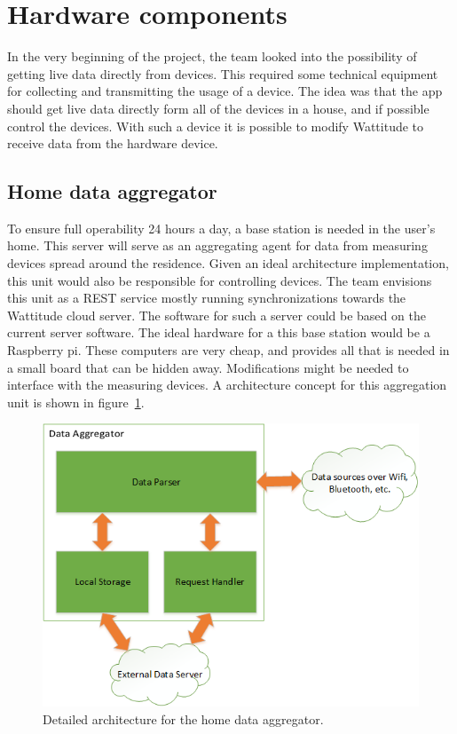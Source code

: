\section{Hardware components}
In the very beginning of the project, the team looked into the possibility of getting live data directly from devices. This required some technical equipment for collecting and transmitting the usage of a device. The idea was that the app should get live data directly form all of the devices in a house, and if possible control the devices. With such a device it is possible to modify Wattitude to receive data from the hardware device.

\subsection{Home data aggregator}
To ensure full operability 24 hours a day, a base station is needed in the user's home. This server will serve as an aggregating agent for data from measuring devices spread around the residence. Given an ideal architecture implementation, this unit would also be responsible for controlling devices. The team envisions this unit as a REST service mostly running synchronizations towards the Wattitude cloud server. The software for such a server could be based on the current server software. The ideal hardware for a this base station would be a Raspberry pi. These computers are very cheap, and provides all that is needed in a small board that can be hidden away. Modifications might be needed to interface with the measuring devices. A architecture concept for this aggregation unit is shown in figure~\ref{fig:aggregator}.

\begin{figure}[H]
\centering
\includegraphics[height=0.4\textheight]{ch/further/fig/home.png}
\caption{Detailed architecture for the home data aggregator.}
\label{fig:aggregator}
\end{figure}

